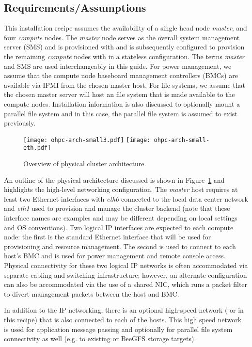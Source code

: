 \subsection{Requirements/Assumptions}
This installation recipe assumes the availability of a single head node {\em
 master}, and four {\em compute} nodes. The {\em master} node serves as the
overall system management server (SMS) and is provisioned with \baseOS{} and is
subsequently configured to provision the remaining {\em compute} nodes with
\provisioner{} in a stateless configuration. The terms {\em master} and SMS are
used interchangeably in this guide. For power management, we assume that
the compute node baseboard management controllers (BMCs) are available via IPMI
from the chosen master host. For file systems, we assume that the chosen master
server will host an \NFS{} file system that is made available to the compute
nodes.
Installation information is also discussed to optionally mount a
parallel file system and in this case, the parallel file system is assumed to
exist previously.
\fi

\begin{figure}[hbt]
\center
{}
\texttt{[image: ohpc-arch-small3.pdf]}
\fi
{}
\texttt{[image: ohpc-arch-small-eth.pdf]}
\fi
\vspace*{-0.2cm}
\caption{Overview of physical cluster architecture.} \label{fig:physical_arch}
\end{figure}
\mbox{}

\vspace*{0.5cm}

An outline of the physical architecture discussed is shown in
Figure~\ref{fig:physical_arch} and highlights the high-level networking
configuration. The {\em master} host requires at least two Ethernet interfaces
with {\em eth0} connected to the local data center network and {\em eth1} used
to provision and manage the cluster backend (note that these interface names
are examples and may be different depending on local settings and OS
conventions). Two logical IP interfaces are expected to each compute node: the
first is the standard Ethernet interface that will be used for provisioning and
resource management. The second is used to connect to each host's BMC and is
used for power management and remote console access. Physical connectivity for
these two logical IP networks is often accommodated via separate cabling and
switching infrastructure; however, an alternate configuration can also be
accommodated via the use of a shared NIC, which runs a packet filter to divert
management packets between the host and BMC.

In addition to the IP networking, there is an optional high-speed network
(\InfiniBand{} or \OmniPath{} in this recipe) that is also connected to each of the
hosts. This high speed network is used for application message passing and
optionally for parallel file system connectivity as well (e.g. to
existing \Lustre{} or BeeGFS storage targets).
\fi
